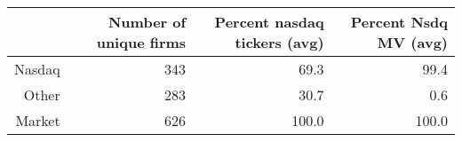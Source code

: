 \begin{table}[ht]
\centering
\begin{tabular}{rrrr}
  \hline
 & Number of unique firms & Percent nasdaq tickers (avg) & Percent Nsdq MV (avg) \\ 
  \hline
Nasdaq & 343 & 69.3 & 99.4 \\ 
  Other & 283 & 30.7 & 0.6 \\ 
  Market & 626 & 100.0 & 100.0 \\ 
   \hline
\end{tabular}
\end{table}
